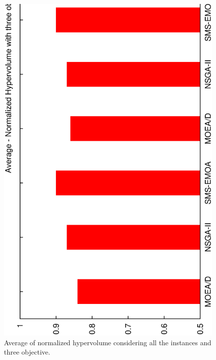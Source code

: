 \begin{figure}[!t]
\centering
\includegraphics[scale=0.25,angle=-90]{img/bar_HV_3obj.eps}
\caption{Average of normalized hypervolume considering all the instances and three objective.}
\label{fig_sim}
\end{figure}
